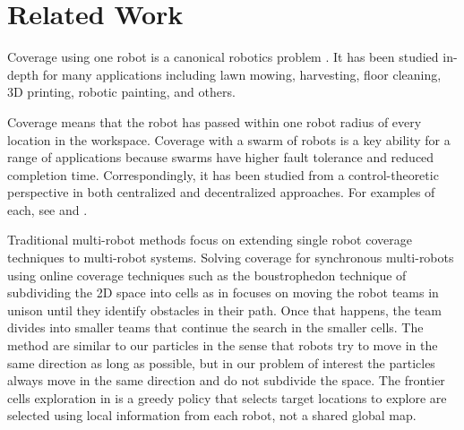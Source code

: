 
\section{Related Work}\label{sec:RelatedWork}

Coverage using one robot is a canonical robotics problem \cite{choset2001coverage}. It has been studied in-depth for many applications including lawn mowing, harvesting, floor cleaning, 3D printing, robotic painting, and others. 

Coverage means that the robot has passed within one robot radius of every location in the workspace. Coverage with a swarm of robots is a key ability for a range of applications because swarms have higher fault tolerance and reduced completion time. Correspondingly, it has been studied from a control-theoretic perspective in  both centralized and decentralized approaches. For examples of each, see  \cite{zheng2005multi} and \cite{wagner1999distributed}.

Traditional multi-robot methods focus on extending single robot coverage techniques to multi-robot systems. Solving coverage for synchronous multi-robots using online coverage techniques such as the boustrophedon technique of subdividing the 2D space into cells as in \cite{latimer2002towards} focuses on moving the robot teams in unison until they identify obstacles in their path. 
Once that happens, the team divides into smaller teams that continue the search in the smaller cells. 
The method are similar to our particles in the sense that robots try to move in the same direction as long as possible, but in our problem of interest the particles always move in the same direction and do not subdivide the space.  
The frontier cells exploration in \cite{yamauchi1998frontier} is a greedy policy that selects target locations to explore are selected using local information from each robot, not a shared global map.
 

